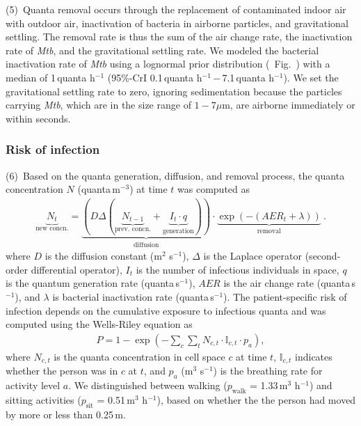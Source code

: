 \documentclass[fleqn,11pt]{wlscirep}
\begin{document}
(5)~Quanta removal occurs through the replacement of contaminated indoor air with outdoor air, inactivation of bacteria in airborne particles, and gravitational settling. The removal rate is thus the sum of the air change rate, the inactivation rate of \emph{Mtb}, and the gravitational settling rate. We modeled the bacterial inactivation rate of \emph{Mtb} using a lognormal prior distribution (\supp~Fig.~) with a median of 1\,quanta h$^{-1}$ (95\%-CrI 0.1\,quanta h$^{-1}$\,$-$\,7.1\,quanta h$^{-1}$)\cite{Loudon1969AMRRD,Lever2000LettersAppliedMicrobio,Gannon2007ResVetSci,Klein2014IJMyco}. We set the gravitational settling rate to zero, ignoring sedimentation because the particles carrying \emph{Mtb}, which are in the size range of $1-7\mu$m\cite{Fennelly2020Lancet}, are airborne immediately or within seconds\cite{Vuorinen2020SafSci}.

\subsubsection*{Risk of infection}

(6)~Based on the quanta generation, diffusion, and removal process, the quanta concentration $N$ (quanta\,m$^{-3}$) at time $t$ was computed as 
\begin{align}\label{eq:spattemp-N}
    \underbrace{N_{t}}_{\text{new concn.}} = \underbrace{\left(D \Delta (\underbrace{N_{t-1}}_{\text{prev. concn.}} + \underbrace{I_t \cdot q}_{\text{generation}})\right)}_{\text{diffusion}} \cdot \underbrace{\exp\left(-(AER_t + \lambda)\right)}_{\text{removal}} ~.
\end{align}
where $D$ is the diffusion constant (m$^2$ s$^{-1}$), $\Delta$ is the Laplace operator (second-order differential operator), $I_t$ is the number of infectious individuals in space, $q$ is the quantum generation rate (quanta\,s$^{-1}$), $AER$ is the air change rate (quanta\,s$^{-1}$), and $\lambda$ is bacterial inactivation rate (quanta\,s$^{-1}$). The patient-specific risk of infection depends on the cumulative exposure to infectious quanta and was computed using the Wells-Riley equation as
\begin{align}
    P = 1-\exp\left(-\sum_c \sum_t N_{c,t} \cdot \mathbb{I}_{c,t} \cdot p_a\right),
\end{align}
where $N_{c,t}$ is the quanta concentration in cell space $c$ at time $t$, $\mathbb{I}_{c,t}$ indicates whether the person was in $c$ at $t$, and $p_a$ (m$^3$ s$^{-1}$) is the breathing rate for activity level $a$. We distinguished between walking ($p_\mathrm{walk}$ = 1.33\,m$^3$ h$^{-1}$) and sitting activities ($p_\mathrm{sit}$ = 0.51\,m$^3$ h$^{-1}$)\cite{Adams1993}, based on whether the the person had moved by more or less than 0.25\,m.
\end{document}

